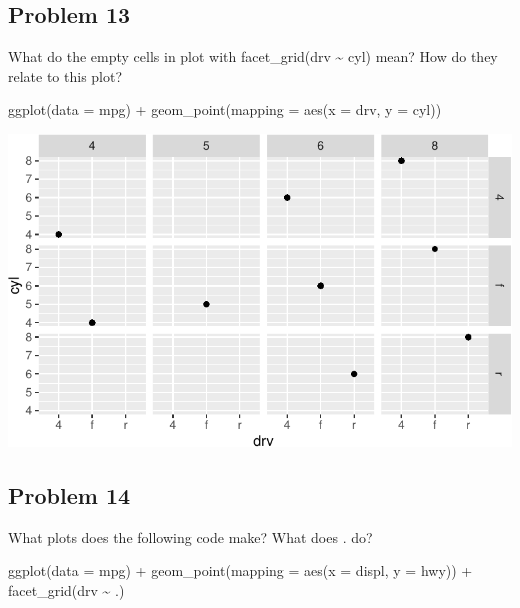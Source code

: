 \documentclass[
  letterpaper,
  DIV=11,
  numbers=noendperiod]{scrreprt}
\newenvironment{Shaded}{\begin{snugshade}}{\end{snugshade}}
\newcommand{\AttributeTok}[1]{\textcolor[rgb]{0.40,0.45,0.13}{#1}}
\newcommand{\FunctionTok}[1]{\textcolor[rgb]{0.28,0.35,0.67}{#1}}
\newcommand{\NormalTok}[1]{\textcolor[rgb]{0.00,0.23,0.31}{#1}}
\newcommand{\SpecialCharTok}[1]{\textcolor[rgb]{0.37,0.37,0.37}{#1}}
\begin{document}
\subsection*{Problem 13}\label{problem-13-1}

What do the empty cells in plot with facet\_grid(drv \textasciitilde{}
cyl) mean? How do they relate to this plot?

\begin{Shaded}
\begin{Highlighting}[]
\FunctionTok{ggplot}\NormalTok{(}\AttributeTok{data =}\NormalTok{ mpg) }\SpecialCharTok{+} 
  \FunctionTok{geom\_point}\NormalTok{(}\AttributeTok{mapping =} \FunctionTok{aes}\NormalTok{(}\AttributeTok{x =}\NormalTok{ drv, }\AttributeTok{y =}\NormalTok{ cyl))}
\end{Highlighting}
\end{Shaded}

\includegraphics{Beginning_Data_Visualization_files/figure-pdf/Ex13-1.pdf}

\subsection*{Problem 14}\label{problem-14-1}

What plots does the following code make? What does . do?

\begin{Shaded}
\begin{Highlighting}[]
\FunctionTok{ggplot}\NormalTok{(}\AttributeTok{data =}\NormalTok{ mpg) }\SpecialCharTok{+} 
  \FunctionTok{geom\_point}\NormalTok{(}\AttributeTok{mapping =} \FunctionTok{aes}\NormalTok{(}\AttributeTok{x =}\NormalTok{ displ, }\AttributeTok{y =}\NormalTok{ hwy)) }\SpecialCharTok{+}
  \FunctionTok{facet\_grid}\NormalTok{(drv }\SpecialCharTok{\textasciitilde{}}\NormalTok{ .)}
\end{Highlighting}
\end{Shaded}
\end{document}
